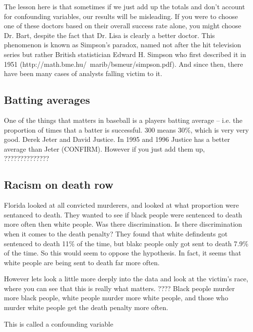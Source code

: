 \documentclass{report}
\begin{document}
The lesson here is that sometimes if we just add up the totals and don't account for confounding variables, our results will be misleading. If you were to choose one of these doctors based on their overall success rate alone, you might choose Dr. Bart, despite the fact that Dr. Lisa is clearly a better doctor. This phenomenon is known as Simpson's paradox, named not after the hit television series but rather British statistician Edward H. Simpson who first described it in 1951 (\todo http://math.bme.hu/~marib/bsmeur/simpson.pdf). And since then, there have been many cases of analysts falling victim to it.

\subsection{Batting averages}
\todo One of the things that matters in baseball is a players batting average -- i.e. the proportion of times that a batter is successful. 300 means 30\%, which is very very good. Derek Jeter and David Justice. In 1995 and 1996 Justice has a better average than Jeter (CONFIRM). However if you just add them up, 
??????????????
\subsection{Racism on death row}
\todo Florida looked at all convicted murderers, and looked at what proportion were sentanced to death. They wanted to see if black people were sentenced to death more often then white people. Was there discrimination. Is there discrimination when it comes to the death penalty? They found that white defindents got sentenced to death 11\% of the time, but blakc people only got sent to death 7.9\% of the time. So this would seem to oppose the hypothesis. In fact, it seems that white people are being sent to death far more often. 

However lets look a little more deeply into the data and look at the victim's race, where you can see that this is really what matters. ???? Black people murder more black people, white people murder more white people, and those who murder white people get the death penalty more often. 

This is called a confounding variable
\end{document}
